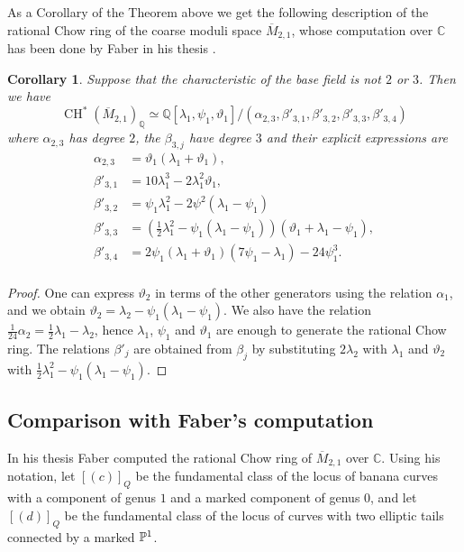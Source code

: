 \documentclass[a4paper, 10pt]{amsart}
\numberwithin{equation}{section}
\numberwithin{subsection}{section}
\newtheorem{corollary}[theorem]{Corollary}
\theoremstyle{definition}
\theoremstyle{remark}
\newcommand{\ch}[1][*]{\operatorname{CH}^{#1}}
\begin{document}
	As a Corollary of the Theorem above we get the following description of the rational Chow ring of the coarse moduli space $\overline{M}_{2,1}$, whose computation over $\mathbb{C}$ has been done by Faber in his thesis \cite{Fab}.
	\begin{corollary}\label{cor:rational chow}
		Suppose that the characteristic of the base field is not $2$ or $3$. Then we have
		\[ \ch(\overline{M}_{2,1})_{\mathbb{Q}}\simeq \mathbb{Q}[\lambda_1,\psi_1,\vartheta_1]/(\alpha_{2,3},\beta'_{3,1},\beta'_{3,2},\beta'_{3,3},\beta'_{3,4}) \]
		where $\alpha_{2,3}$ has degree $2$, the $\beta_{3,j}$ have degree $3$ and their explicit expressions are
		\begin{align*}
			\alpha_{2,3}&=\vartheta_1(\lambda_1+\vartheta_1),\\
			\beta'_{3,1}&=10\lambda_1^3-2\lambda_1^2\vartheta_1,\\
			\beta'_{3,2}&=\psi_1\lambda_1^2-2\psi^2(\lambda_1-\psi_1)\\
			\beta'_{3,3}&=(\frac{1}{2}\lambda_1^2-\psi_1(\lambda_1-\psi_1))(\vartheta_1+\lambda_1-\psi_1),\\
			\beta'_{3,4}&=2\psi_1(\lambda_1 +\vartheta_1)(7\psi_1-\lambda_1) - 24\psi_1^3.\\
		\end{align*}
	\end{corollary}
	\begin{proof}
		One can express $\vartheta_2$ in terms of the other generators using the relation $\alpha_1$, and we obtain $\vartheta_2=\lambda_2-\psi_1(\lambda_1-\psi_1)$. We also have the relation $\frac{1}{24}\alpha_2=\frac{1}{2}\lambda_1-\lambda_2$, hence $\lambda_1$, $\psi_1$ and $\vartheta_1$ are enough to generate the rational Chow ring. The relations $\beta'_{j}$ are obtained from $\beta_j$ by substituting $2\lambda_2$ with $\lambda_1$ and $\vartheta_2$ with $\frac{1}{2}\lambda_1^2-\psi_1(\lambda_1-\psi_1)$.
	\end{proof}
	
	\subsection{Comparison with Faber's computation}
	In his thesis \cite{Fab} Faber computed the rational Chow ring of $\overline{M}_{2,1}$ over $\mathbb{C}$. Using his notation, let $[(c)]_Q$ be the fundamental class of the locus of banana curves with a component of genus $1$ and a marked component of genus $0$, and let $[(d)]_Q$ be the fundamental class of the locus of curves with two elliptic tails connected by a marked $\mathbb{P}^1$. 
	
\end{document}
